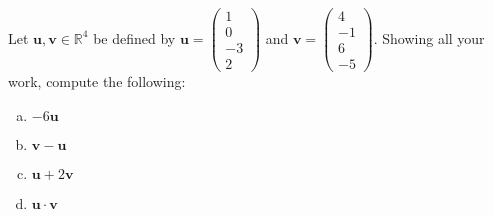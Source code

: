 \documentclass[11pt,letterpaper]{article}
\begin{document}

 Let $\mathbf{u}, \mathbf{v} \in \mathbb{R}^4$ be defined by $\mathbf{u}= \begin{pmatrix} 1 \\ 0 \\ -3 \\ 2 \end{pmatrix}$ and $\mathbf{v}= \begin{pmatrix} 4 \\ -1 \\ 6 \\ -5 \end{pmatrix}$. Showing all your work, compute the following:
	\begin{enumerate}[(a)]
	\item $-6 \mathbf{u}$
	\item $\mathbf{v} - \mathbf{u}$
	\item $\mathbf{u} + 2 \mathbf{v}$
	\item $\mathbf{u} \cdot \mathbf{v}$
	\end{enumerate} \pspace
\end{document}
